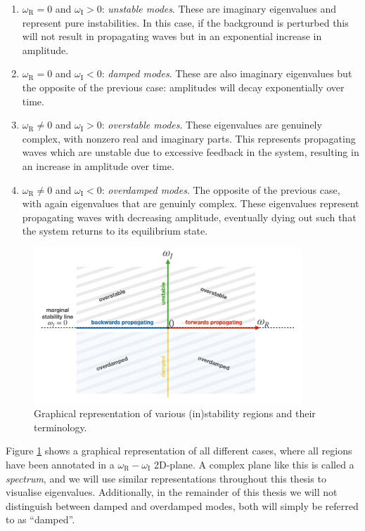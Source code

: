 \begin{enumerate}
  \item $\omega_\text{R} = 0$ and $\omega_\text{I} > 0$: \emph{unstable modes}. These are imaginary eigenvalues and represent pure instabilities. In this case, if the background is perturbed this will not result in propagating waves but in an exponential increase in amplitude.
  \item $\omega_\text{R} = 0$ and $\omega_\text{I} < 0$: \emph{damped modes}. These are also imaginary eigenvalues but the opposite of the previous case: amplitudes will decay exponentially over time.
  \item $\omega_\text{R} \neq 0$ and $\omega_\text{I} > 0$: \emph{overstable modes}. These eigenvalues are genuinely complex, with nonzero real and imaginary parts. This represents propagating waves which are unstable due to excessive feedback in the system, resulting in an increase in amplitude over time.
  \item$\omega_\text{R} \neq 0$ and $\omega_\text{I} < 0$: \emph{overdamped modes}. The opposite of the previous case, with again eigenvalues that are genuinly complex. These eigenvalues represent propagating waves with decreasing amplitude, eventually dying out such that the system returns to its equilibrium state.
\end{enumerate}

\begin{figure}[b]
  \centering
  \includegraphics[width=0.9\textwidth]{spectral_plane.png}
  \caption{Graphical representation of various (in)stability regions and their terminology.}
  \label{fig: spectral_plane}
\end{figure}

Figure \ref{fig: spectral_plane} shows a graphical representation of all different cases, where all regions have been annotated in a $\omega_\text{R} - \omega_\text{I}$ 2D-plane. A complex plane like this is called a \emph{spectrum}, and we will use similar representations throughout this thesis to visualise eigenvalues. Additionally, in the remainder of this thesis we will not distinguish between damped and overdamped modes, both will simply be referred to as ``damped''.


